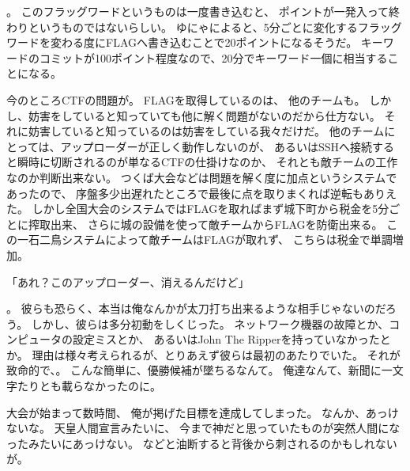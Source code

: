 。
このフラッグワードというものは一度書き込むと、
ポイントが一発入って終わりというものではないらしい。
ゆにゃによると、5分ごとに変化するフラッグワードを変わる度にFLAGへ書き込むことで20ポイントになるそうだ。
キーワードのコミットが100ポイント程度なので、20分でキーワード一個に相当することになる。

今のところCTFの問題が。
FLAGを取得しているのは、
他のチームも。
しかし、妨害をしていると知っていても他に解く問題がないのだから仕方ない。
それに妨害していると知っているのは妨害をしている我々だけだ。
他のチームにとっては、アップローダーが正しく動作しないのが、
あるいはSSHへ接続すると瞬時に切断されるのが単なるCTFの仕掛けなのか、
それとも敵チームの工作なのか判断出来ない。
つくば大会などは問題を解く度に加点というシステムであったので、
序盤多少出遅れたところで最後に点を取りまくれば逆転もありえた。
しかし全国大会のシステムではFLAGを取ればまず城下町から税金を5分ごとに搾取出来、
さらに城の設備を使って敵チームからFLAGを防衛出来る。
この一石二鳥システムによって敵チームはFLAGが取れず、
こちらは税金で単調増加。

「あれ？このアップローダー、消えるんだけど」

。
彼らも恐らく、本当は俺なんかが太刀打ち出来るような相手じゃないのだろう。
しかし、彼らは多分初動をしくじった。
ネットワーク機器の故障とか、コンピュータの設定ミスとか、
あるいはJohn The Ripperを持っていなかったとか。
理由は様々考えられるが、とりあえず彼らは最初のあたりでいた。
それが致命的で、。
こんな簡単に、優勝候補が墜ちるなんて。
俺達なんて、新聞に一文字たりとも載らなかったのに。

大会が始まって数時間、
俺が掲げた目標を達成してしまった。
なんか、あっけないな。
天皇人間宣言みたいに、
今まで神だと思っていたものが突然人間になったみたいにあっけない。
などと油断すると背後から刺されるのかもしれないが。

